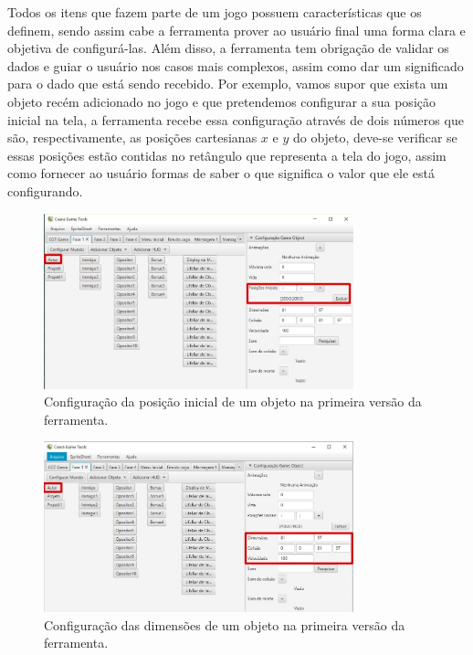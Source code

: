 \documentclass[12pt,twoside,openright,a4paper,english,brazil,sumario=tradicional]{abntex2}
\begin{document}
Todos os itens que fazem parte de um jogo possuem características que os definem, sendo assim cabe a ferramenta prover ao usuário final uma forma clara e objetiva de configurá-las. Além disso, a ferramenta tem obrigação de validar os dados e guiar o usuário nos casos mais complexos, assim como dar um significado para o dado que está sendo recebido. Por exemplo, vamos supor que exista um objeto recém adicionado no jogo e que pretendemos configurar a sua posição inicial na tela, a ferramenta recebe essa configuração através de dois números que são, respectivamente, as posições cartesianas $x$ e $y$ do objeto, deve-se verificar se essas posições estão contidas no retângulo que representa a tela do jogo, assim como fornecer ao usuário formas de saber o que significa o valor que ele está configurando.

\begin{figure}[h]
   \label{fig:obj_pos_inicial}
\centering
\includegraphics[width=0.8\textwidth]{images/pos_inicial.jpg}
\caption{Configuração da posição inicial de um objeto na primeira versão da ferramenta.}
\end{figure}

\begin{figure}[h]
   \label{fig:obj_dimensoes}
\centering
\includegraphics[width=0.8\textwidth]{images/obj_dimensoes.jpg}
\caption{Configuração das dimensões de um objeto na primeira versão da ferramenta.}
\end{figure}
\end{document}
